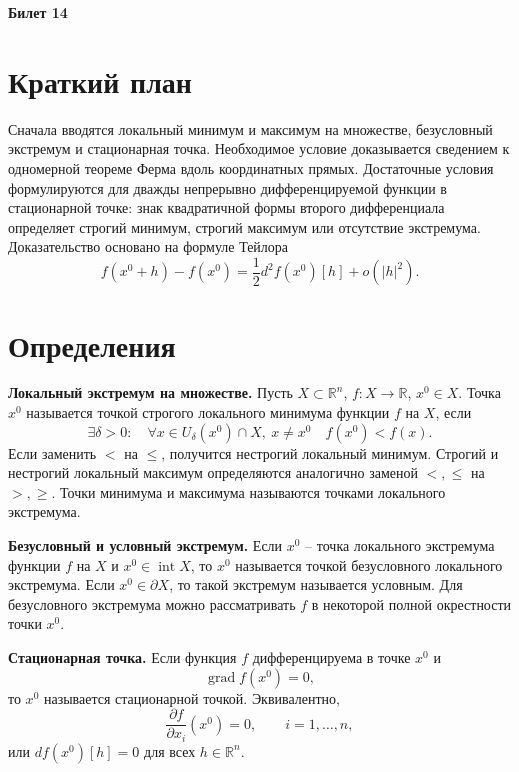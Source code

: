 \documentclass[12pt,a4paper]{article}
\newcommand{\R}{\mathbb{R}}
\newcommand{\grad}{\operatorname{grad}}
\newcommand{\Int}{\operatorname{int}}
\begin{document}
\begin{center}
{\Large\bfseries Билет 14}
\end{center}

\noindent{}

\section*{Краткий план}

Сначала вводятся локальный минимум и максимум на множестве, безусловный
экстремум и стационарная точка. Необходимое условие доказывается сведением к
одномерной теореме Ферма вдоль координатных прямых. Достаточные условия
формулируются для дважды непрерывно дифференцируемой функции в стационарной
точке: знак квадратичной формы второго дифференциала определяет строгий
минимум, строгий максимум или отсутствие экстремума. Доказательство основано
на формуле Тейлора
\[
  f(x^0+h)-f(x^0)
  =
  \frac12 d^2 f(x^0)[h]+o(|h|^2).
\]

\section*{Определения}

\textbf{Локальный экстремум на множестве.}
Пусть \(X\subset\R^n\), \(f:X\to\R\), \(x^0\in X\). Точка \(x^0\) называется
точкой строгого локального минимума функции \(f\) на \(X\), если
\[
  \exists\delta>0:\quad
  \forall x\in U_\delta(x^0)\cap X,\ x\ne x^0
  \quad f(x^0)<f(x).
\]
Если заменить \(<\) на \(\le\), получится нестрогий локальный минимум.
Строгий и нестрогий локальный максимум определяются аналогично заменой
\(<,\le\) на \(>,\ge\). Точки минимума и максимума называются точками
локального экстремума.

\textbf{Безусловный и условный экстремум.}
Если \(x^0\) -- точка локального экстремума функции \(f\) на \(X\) и
\(x^0\in\Int X\), то \(x^0\) называется точкой безусловного локального
экстремума. Если \(x^0\in\partial X\), то такой экстремум называется условным.
Для безусловного экстремума можно рассматривать \(f\) в некоторой полной
окрестности точки \(x^0\).

\textbf{Стационарная точка.}
Если функция \(f\) дифференцируема в точке \(x^0\) и
\[
  \grad f(x^0)=0,
\]
то \(x^0\) называется стационарной точкой. Эквивалентно,
\[
  \frac{\partial f}{\partial x_i}(x^0)=0,\qquad i=1,\dots,n,
\]
или \(df(x^0)[h]=0\) для всех \(h\in\R^n\).
\end{document}
